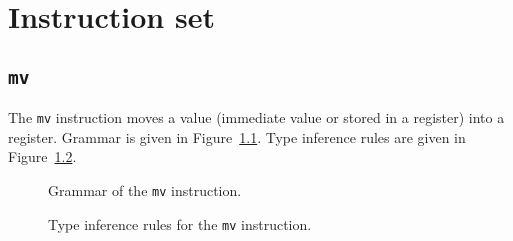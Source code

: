 \chapter{Instruction set}\label{chap:nstar-instructionset}

\section{\texttt{mv}}\label{sec:nstar-instructionset-mv}

The \texttt{mv} instruction moves a value (immediate value or stored in a register) into a register.
Grammar is given in Figure~\ref{fig:nstar-instructionset-mv-grammar}.
Type inference rules are given in Figure~\ref{fig:nstar-instructionset-mv-typerules}.

\begin{figure}[H]
  \centering


  \caption{Grammar of the \texttt{mv} instruction.}
  \label{fig:nstar-instructionset-mv-grammar}
\end{figure}

\begin{figure}[H]
  \centering


  \caption{Type inference rules for the \texttt{mv} instruction.}
  \label{fig:nstar-instructionset-mv-typerules}
\end{figure}

